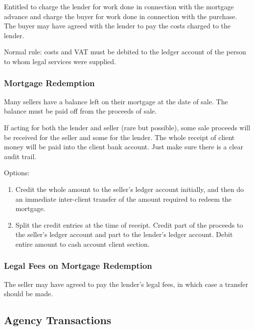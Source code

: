 \documentclass[
]{article}
\providecommand{\tightlist}{%
  \setlength{\itemsep}{0pt}\setlength{\parskip}{0pt}}
\begin{document}
Entitled to charge the lender for work done in connection with the
mortgage advance and charge the buyer for work done in connection with
the purchase. The buyer may have agreed with the lender to pay the costs
charged to the lender.

Normal rule: costs and VAT must be debited to the ledger account of the
person to whom legal services were supplied.

\hypertarget{mortgage-redemption}{%
\subsubsection{Mortgage Redemption}\label{mortgage-redemption}}

Many sellers have a balance left on their mortgage at the date of sale.
The balance must be paid off from the proceeds of sale.

If acting for both the lender and seller (rare but possible), some sale
proceeds will be received for the seller and some for the lender. The
whole receipt of client money will be paid into the client bank account.
Just make sure there is a clear audit trail.

Options:

\begin{enumerate}
\def\labelenumi{\arabic{enumi}.}
\tightlist
\item
  Credit the whole amount to the seller's ledger account initially, and
  then do an immediate inter-client transfer of the amount required to
  redeem the mortgage.
\item
  Split the credit entries at the time of receipt. Credit part of the
  proceeds to the seller's ledger account and part to the lender's
  ledger account. Debit entire amount to cash account client section.
\end{enumerate}

\hypertarget{legal-fees-on-mortgage-redemption}{%
\subsubsection{Legal Fees on Mortgage
Redemption}\label{legal-fees-on-mortgage-redemption}}

The seller may have agreed to pay the lender's legal fees, in which case
a transfer should be made.

\hypertarget{agency-transactions}{%
\subsection{Agency Transactions}\label{agency-transactions}}
\end{document}
